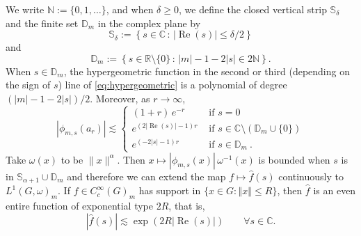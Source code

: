 \documentclass[12pt,a4paper]{amsart}
\theoremstyle{definition}
\theoremstyle{remark}
\numberwithin{equation}{section}
\newcommand{\norm}[1]{\left\Vert#1\right\Vert}
\newcommand{\abs}[1]{\left\vert#1\right\vert}
\newcommand{\set}[1]{\left\{#1\right\}}
\newcommand{\R}{\mathbb{R}}
\newcommand{\C}{\mathbb{C}}
\newcommand{\N}{\mathbb{N}}
\renewcommand{\Re}{\operatorname{Re}}
\newcommand{\Strip}{\mathbb{S}}
\newcommand{\Discr}{\mathbb{D}_m}
\def\be{\begin{equation}}
\def\ee{\end{equation}}
\newcommand{\var}{s}
\begin{document}
We write $\N := \{ 0,1,\ldots\}$, and when $\delta\ge 0$, we define the closed vertical strip $\Strip_\delta$ and the finite set $\Discr$  in the complex plane by
\[
\Strip_\delta := \set{\var\in \C\, :\, \abs{ \Re( \var) } \le \delta/2}
\]
and
\[
\Discr := \set{\var\in \R\setminus\{0\}\, :\,  |m| - 1 - 2|\var| \in 2\N }.
\]
When $\var \in \Discr$, the hypergeometric function in the second or third (depending on the sign of $\var$) line of \eqref{eq:hypergeometric} is a polynomial
 of degree $(|m|-1 - 2|\var|)/2$.
Moreover, as $r\to \infty$,
\[
|\phi_{m,\var}(a_r)|
\lesssim 
\begin{cases}(1+r)\,e^{-r} &\text{ if } \var=0
\\[3pt]
e^{(2\left|\Re(\var) \right|-1)r} & \text{ if } \var\in\C\setminus (\Discr \cup \{0\}) 
\\[3pt]
e^{(-2|\var|-1)r}&\text{ if } \var\in \Discr\ .
\end{cases}
\]
Take $\omega(x)$ to be $\|x\|^\alpha$.
Then $x\mapsto |\phi_{m,\var}(x)|\, \omega^{-1}(x)$ is bounded when $\var$ is in $\Strip_{\alpha+1}\cup\Discr$ and therefore we can extend the map $f\mapsto \hat f(\var)$
continuously to $L^1(G,\omega)_m$.
If $f \in C_c^\infty(G)_m$ 
has support in $\{ x \in G: \norm{x} \leq R\}$, then $\hat f$ is an even entire function of exponential type $2R$, that is, 
\be\label{stimastriscia}
|\hat f(s)|  \lesssim \exp(2R |\Re(s)|) 
\qquad\forall s \in \C .
\ee



\bigskip
\end{document}
